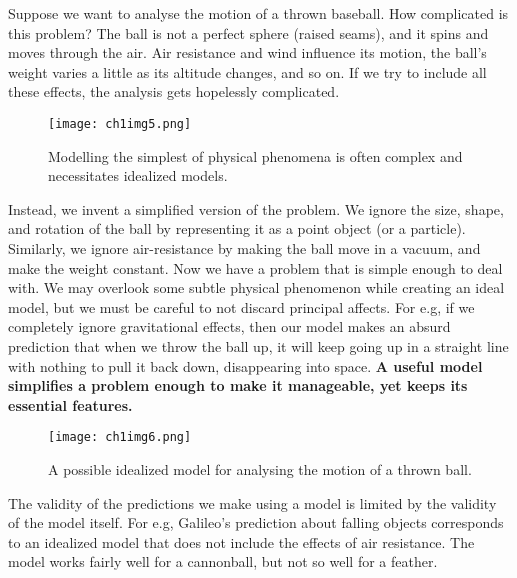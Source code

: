 Suppose we want to analyse the motion of a thrown baseball. How complicated is this problem? The ball is not a perfect sphere (raised seams), and it spins and moves through the air. Air resistance and wind influence its motion, the ball's weight varies a little as its altitude changes, and so on. If we try to include all these effects, the analysis gets hopelessly complicated. 

\begin{figure}[htbp]
  \centering
  \texttt{[image: ch1img5.png]}
  \caption{Modelling the simplest of physical phenomena is often complex and necessitates idealized models.}
  \label{fig:ch1img5}
\end{figure}

Instead, we invent a simplified version of the problem. We ignore the size, shape, and rotation of the ball by representing it as a point object (or a particle). Similarly, we ignore air-resistance by making the ball move in a vacuum, and make the weight constant. Now we have a problem that is simple enough to deal with. We may overlook some subtle physical phenomenon while creating an ideal model, but we must be careful to not discard principal affects. For e.g, if we completely ignore gravitational effects, then our model makes an absurd prediction that when we throw the ball up, it will keep going up in a straight line with nothing to pull it back down, disappearing into space. \textbf{A useful model simplifies a problem enough to make it manageable, yet keeps its essential features.}

\begin{figure}[htbp]
 \centering
\texttt{[image: ch1img6.png]}
  \caption{A possible idealized model for analysing the motion of a thrown ball.}
  \label{fig:ch1img6}
\end{figure}

The validity of the predictions we make using a model is limited by the validity of the model itself. For e.g, Galileo's prediction about falling objects corresponds to an idealized model that does not include the effects of air resistance. The model works fairly well for a cannonball, but not so well for a feather.

